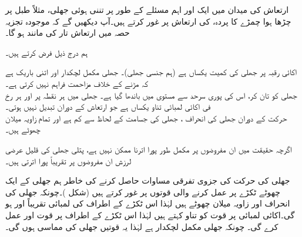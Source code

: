 ارتعاش کی میدان میں ایک اور اہم مسئلے کے طور پر تننی ہوئی جھلی، مثلاً طبل پر چڑھا ہوا چمڑے کا پردہ، کی ارتعاش پر غور کرتے ہیں۔آپ دیکھیں گے کہ موجودہ تجزیہ حصہ  میں ارتعاش تار کی مانند ہو گا۔ 

ہم درج ذیل فرض کرتے  ہیں۔

\quad اکائی رقبہ پر جھلی کی کمیت یکساں ہے (ہم جنسی جھلی)۔ جھلی مکمل لچکدار اور اتنی باریک ہے کہ مڑنے کے خلاف مزاحمت فراہم نہیں کرتی ہے۔\\
\quad جھلی کو تان کر، اس کی پوری سرحد سے  مستوی میں باندھا گیا ہے۔ جھلی میں ہر نقطہ  پر اور ہر رخ  فی اکائی لمبائی تناو  یکساں ہے جو ارتعاش کے دوران تبدیل نہیں ہوتی۔\\
 \quad حرکت کے دوران جھلی کی انحراف ، جھلی کی جسامت کے لحاظ سے  کم ہے اور تمام زاویہ میلان چھوٹے ہیں۔      

اگرچہ حقیقت میں ان مفروضوں پر مکمل طور پورا اترنا ممکن نہیں ہے، پتلی جھلی کی قلیل عرضی لرزش ان مفروضوں پر تقریباً پورا اترتی ہیں۔

جھلی کی حرکت کی جزوی تفرقی مساوات حاصل کرنے کی خاطر ہم جھلی کے ایک چھوٹے ٹکڑے پر عمل کرنے والی قوتوں پر غور کرتے ہیں (شکل )۔چونکہ جھلی کی انحراف اور زاویہ میلان چھوٹے ہیں لہٰذا اس ٹکڑے کے اطراف کی لمبائی تقریباً  اور  ہو گی۔اکائی لمبائی پر قوت کو تناو  کہتے ہیں لہٰذا اس ٹکڑے کے اطراف پر قوت
  اور  عمل کرے گی۔ چونکہ جھلی مکمل لچکدار ہے لہٰذا یہ قوتیں جھلی کی مماسی ہوں گی۔

